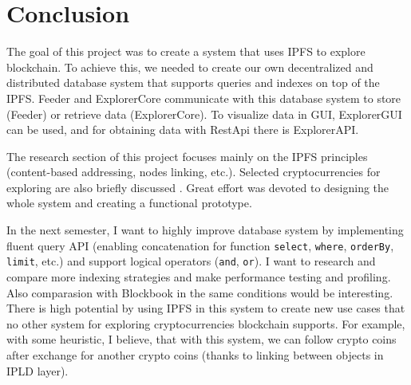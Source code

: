 \chapter{Conclusion}
\label{Conclusion}

The goal of this project was to create a system that uses IPFS to explore blockchain. To achieve this, we needed to create our own decentralized and distributed database system that supports queries and indexes on top of the IPFS. Feeder and ExplorerCore communicate with this database system to store (Feeder) or retrieve data (ExplorerCore). To visualize data in GUI, ExplorerGUI can be used, and for obtaining data with RestApi there is ExplorerAPI.

The research section of this project focuses mainly on the IPFS principles (content-based addressing, nodes linking, etc.). Selected cryptocurrencies for exploring are also briefly discussed . Great effort was devoted to designing the whole system and creating a functional prototype.

In the next semester, I want to highly improve database system by implementing fluent query API (enabling concatenation for function \texttt{select}, \texttt{where}, \texttt{orderBy}, \texttt{limit}, etc.) and support logical operators (\texttt{and}, \texttt{or}). I want to research and compare more indexing strategies and make performance testing and profiling. Also comparasion with Blockbook in the same conditions would be interesting. There is high potential by using IPFS in this system to create new use cases that no other system for exploring cryptocurrencies blockchain supports. For example, with some heuristic, I believe, that with this system, we can follow crypto coins after exchange for another crypto coins (thanks to linking between objects in IPLD layer).

